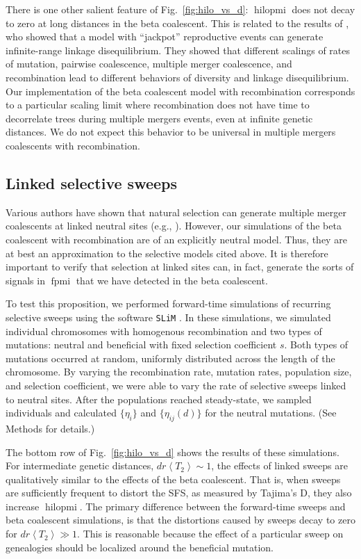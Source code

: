 \documentclass[11pt, letterpaper]{article}   	%
\newcommand{\fig}[1]{Fig.~\ref{#1}}
\newcommand{\E}[1]{\left< #1 \right>}
\DeclareMathOperator{\fpmi}{fpmi}
\DeclareMathOperator{\hilopmi}{hilopmi}
\begin{document}
There is one other salient feature of \fig{fig:hilo_vs_d}: $\hilopmi$ does not decay to zero at long distances in the beta coalescent.
This is related to the results of \cite{EldonWakeley20??}, who showed that a model with ``jackpot'' reproductive events can generate infinite-range linkage disequilibrium.
They showed that different scalings of rates of mutation, pairwise coalescence, multiple merger coalescence, and recombination lead to different behaviors of diversity and linkage disequilibrium.
Our implementation of the beta coalescent model with recombination corresponds to a particular scaling limit where recombination does not have time to decorrelate trees during multiple mergers events, even at infinite genetic distances.
We do not expect this behavior to be universal in multiple mergers coalescents with recombination.

\subsection*{Linked selective sweeps}

Various authors have shown that natural selection can generate multiple merger coalescents at linked neutral sites (e.g., \cite{DurrettSchweinsberg2005, CoopRalph, NeherHallatscheck2013, DesaiEtAl, Seger}).
However, our simulations of the beta coalescent with recombination are of an explicitly neutral model.
Thus, they are at best an approximation to the selective models cited above.
It is therefore important to verify that selection at linked sites can, in fact, generate the sorts of signals in $\fpmi$ that we have detected in the beta coalescent.

To test this proposition, we performed forward-time simulations of recurring selective sweeps using the software \texttt{SLiM} \autocite{MesserEtAl201?}.
In these simulations, we simulated individual chromosomes with homogenous recombination and two types of mutations: neutral and beneficial with fixed selection coefficient $s$.
Both types of mutations occurred at random, uniformly distributed across the length of the chromosome.
By varying the recombination rate, mutation rates, population size, and selection coefficient, we were able to vary the rate of selective sweeps linked to neutral sites.
After the populations reached steady-state, we sampled individuals and calculated $\{\eta_i\}$ and $\{\eta_{ij}(d)\}$ for the neutral mutations.
(See Methods for details.)

The bottom row of \fig{fig:hilo_vs_d} shows the results of these simulations.
For intermediate genetic distances, $d r \E{T_2} \sim 1$, the effects of linked sweeps are qualitatively similar to the effects of the beta coalescent.
That is, when sweeps are sufficiently frequent to distort the SFS, as measured by Tajima's D, they also increase $\hilopmi$.
The primary difference between the forward-time sweeps and beta coalescent simulations, is that the distortions caused by sweeps decay to zero for $d r \E{T_2} \gg 1$.
This is reasonable because the effect of a particular sweep on genealogies should be localized around the beneficial mutation.
\end{document}
